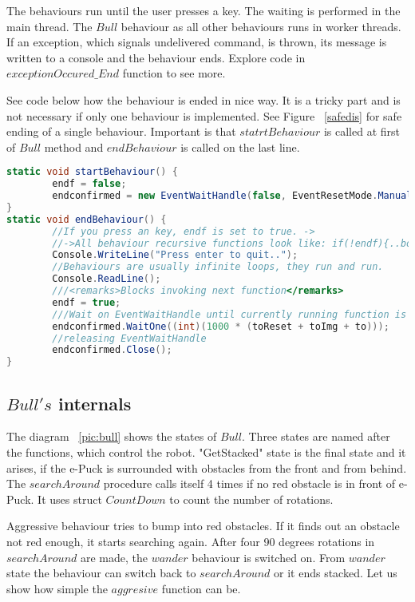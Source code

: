 	The behaviours run until the user presses a key. The waiting is performed in the main thread. 
	The $Bull$ behaviour as all other behaviours runs in worker threads.
	If an exception, which signals undelivered command, is thrown, 
	its message is written to a console and the behaviour ends. 
	Explore code in $exceptionOccured\_End$ function to see more.

	See code below how the behaviour is ended in nice way. 
	It is a tricky part and is not necessary if only one behaviour is implemented. See Figure ~\ref{safedis}
	for safe ending of a single behaviour.
	Important is that $statrtBehaviour$ is called at first of $Bull$ method and $endBehaviour$ is called on the last line.
\begin{lstlisting}[language=cs]
static void startBehaviour() {
        endf = false;
        endconfirmed = new EventWaitHandle(false, EventResetMode.ManualReset);
}
static void endBehaviour() {        
        //If you press an key, endf is set to true. ->
        //->All behaviour recursive functions look like: if(!endf){..body..}else endconfirmed.Set();
        Console.WriteLine("Press enter to quit..");
        //Behaviours are usually infinite loops, they run and run.
        Console.ReadLine();
        ///<remarks>Blocks invoking next function</remarks>
        endf = true;
        ///Wait on EventWaitHandle until currently running function is finished.
        endconfirmed.WaitOne((int)(1000 * (toReset + toImg + to)));
        //releasing EventWaitHandle
        endconfirmed.Close();
}
\end{lstlisting}

\subsection{$Bull's$ internals} \label{bull}
	The diagram ~\ref{pic:bull} shows the states of $Bull$.
	Three states are named after the functions, which control the robot. "GetStacked" state
	is the final state and it arises, if the e-Puck is surrounded with obstacles from the front and from behind.
	The $searchAround$ procedure calls itself 4 times if no red obstacle is in front of e-Puck.
	It uses struct $CountDown$ to count the number of rotations.

	Aggressive behaviour tries to bump into red obstacles. If it finds out an obstacle not red enough, it
	starts searching again. After four 90 degrees rotations in $searchAround$ are made, 
	the $wander$ behaviour is switched on. From $wander$ state the behaviour 
	can switch back to $searchAround$ or it  ends stacked.
	Let us show how simple the $aggresive$ function can be.

